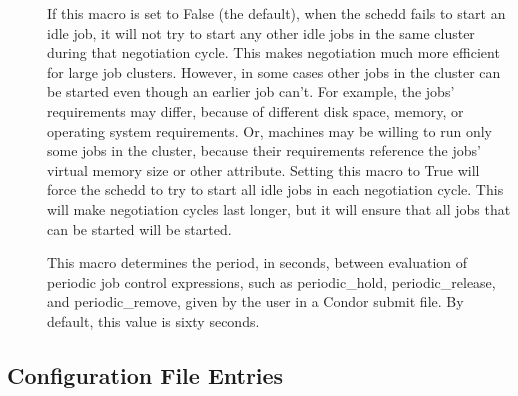 \begin{description}
\item[]
  \label{param:NegotiateAllJobsInCluster}
  If this macro is set to False (the default), when the schedd fails
  to start an idle job, it will not try to start any other
  idle jobs in the same cluster during that negotiation cycle.  This
  makes negotiation much more efficient for large job clusters.
  However, in some cases other jobs in the cluster can be started even
  though an earlier job can't.  For example, the jobs' requirements
  may differ, because of different disk space, memory, or
  operating system requirements.  Or, machines may be willing to run
  only some jobs in the cluster, because their requirements reference
  the jobs' virtual memory size or other attribute.  Setting this
  macro to True will force the schedd to try to start all idle jobs in
  each negotiation cycle.  This will make negotiation cycles last
  longer, but it will ensure that all jobs that can be started will be
  started.

\item[]
  \label{param:PeriodicExprInterval}
  This macro determines the period, in seconds, between evaluation
  of periodic job control expressions, such as periodic\_hold,
  periodic\_release, and periodic\_remove, given by the user in
  a Condor submit file. By default, this value is sixty seconds.
\end{description}

\subsection{\label{sec:Shadow-Config-File-Entries}
 Configuration File Entries}

